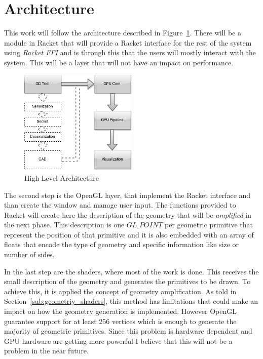 
%
%

\section{Architecture} %
\label{sec:architecture}

This work will follow the architecture described in Figure~\ref{fig:architecture}.
There will be a module in Racket that will provide a Racket interface for the rest of the system using \emph{Racket FFI} and is through this that the users will mostly interact with the system. This will be a layer that will not have an impact on performance. 


\begin{figure}
	\vspace{-15pt}
    \centering
	\includegraphics[width=0.5\textwidth]{img/Architecture/GD-Fast-Pipeline.png}
	\caption{High Level Architecture}
	\label{fig:architecture}
	\vspace{-15pt}
\end{figure}

The second step is the OpenGL layer, that implement the Racket interface and than create the window and manage user input. The functions provided to Racket will create here the description of the geometry that will be \emph{amplified} in the next phase. This description is one $GL\_POINT$ per geometric primitive that represent the position of that primitive and it is also embedded with an array of floats that encode the type of geometry and specific information like size or number of sides.

In the last step are the shaders, where most of the work is done. This receives the small description of the geometry and generates the primitives to be drawn. To achieve this, it is applied the concept of geometry amplification. As told in Section~\ref{sub:geometriy_shaders}, this method has limitations that could make an impact on how the geometry generation is implemented. However OpenGL guarantee support for at least 256 vertices which is enough to generate the majority of geometric primitives. Since this problem is hardware dependent and GPU hardware are getting more powerful I believe that this will not be a problem in the near future.

